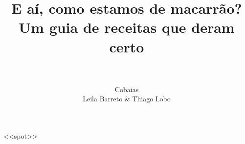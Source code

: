\documentclass[a4paper, 8pt]{book}
\title
{
	\vspace*{-12.8cm}
	\scalebox{1.2}
	{
		\textbf{E aí, como estamos de macarrão?}
	}
	\scalebox{0.84}
	{
		Um guia de receitas que deram certo
	}
}
\author
{
	\\[3.0cm]
	\centering
	\scalebox{1.2}
	{
	    \begin{tabular}{cc}
			\multicolumn{2}{c}{
				Cobaias
			}
			\\[0.15cm]
			\multicolumn{2}{c}{
				Leila Barreto \& Thiago Lobo
			}
		\end{tabular}
	}
}
\date{}
\begin{document}
	\BgThispage
	\maketitle
		
	\newpage
	\vspace*{-3cm}
	\tableofcontents
	
	<<spot>>
\end{document}
